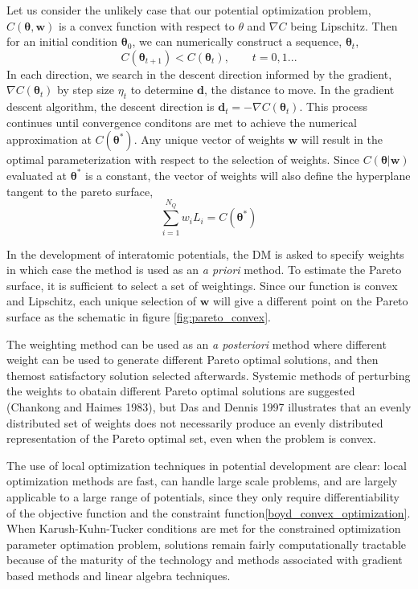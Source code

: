 Let us consider the unlikely case that our potential optimization problem, $C(\bm{\theta},\bm{w})$ is a convex function with respect to $\theta$ and $\nabla C$ being Lipschitz.  Then for an initial condition $\bm{\theta}_0$, we can numerically construct a sequence, ${\bm{\theta}_t}$,
\begin{equation}
	C(\bm{\theta}_{t+1}) < C(\bm{\theta}_{t}), \qquad t = 0,1...
\end{equation}
In each direction, we search in the descent direction informed by the gradient, $\nabla C(\bm{\theta}_t)$ by step size $\eta_t$ to determine $\bm{d}$, the distance to move.  In the gradient descent algorithm, the descent direction is $\bm{d}_t = - \nabla C(\bm{\theta}_t)$.  This process continues until convergence conditons are met to achieve the numerical approximation at $C(\bm{\theta}^*)$.  Any unique vector of weights $\bm{w}$ will result in the optimal parameterization with respect to the selection of weights.  Since $C(\bm{\theta}|\bm{w})$ evaluated at $\bm{\theta}^*$ is a constant, the vector of weights will also define the hyperplane tangent to the pareto surface,
\begin{equation}
	\sum_{i=1}^{N_Q} w_i L_i = C(\bm{\theta}^*)
\end{equation}

In the development of interatomic potentials, the DM is asked to specify weights in which case the method is used as an \emph{a priori} method.
To estimate the Pareto surface, it is sufficient to select a set of weightings.  Since our function is convex and Lipschitz, each unique selection of $\bm{w}$ will give a different point on the Pareto surface as the schematic in figure \ref{fig:pareto_convex}.

The weighting method can be used as an \emph{a posteriori} method where different weight can be used to generate different Pareto optimal solutions, and then themost satisfactory solution selected afterwards.  Systemic methods of perturbing the weights to obatain different Pareto optimal solutions are suggested (Chankong and Haimes 1983), but Das and Dennis 1997 illustrates that an evenly distributed set of weights does not necessarily produce an evenly distributed representation of the Pareto optimal set, even when the problem is convex.

The use of local optimization techniques in potential development are clear: local optimization methods are fast, can handle large scale problems, and are largely applicable to a large range of potentials, since they only require differentiability of the objective function and the constraint function\ref{boyd_convex_optimization}.  When Karush-Kuhn-Tucker conditions\cite{karush1939_kkt,kuhn1951_kkt} are met for the constrained optimization parameter optimation problem, solutions remain fairly computationally tractable because of the maturity of the technology and methods associated with gradient based methods and linear algebra techniques.

